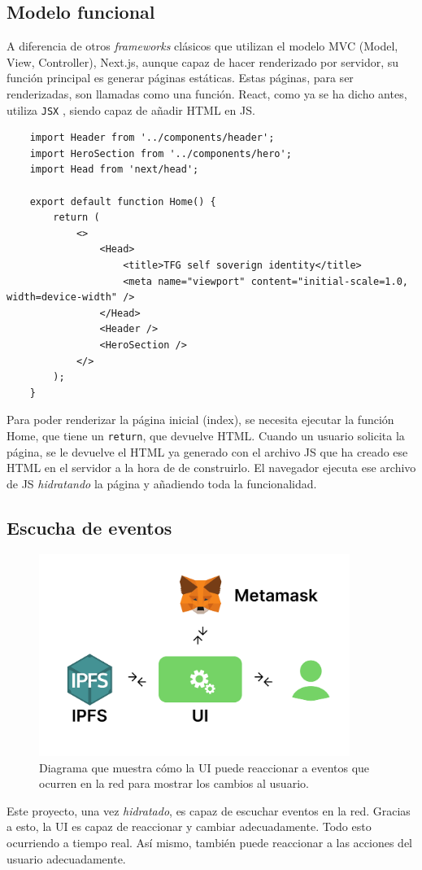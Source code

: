 \subsection{Modelo funcional}
A diferencia de otros \textit{frameworks} clásicos que utilizan el modelo MVC (Model, View, Controller), Next.js, aunque capaz de hacer renderizado por servidor, su función principal es generar páginas estáticas. Estas páginas, para ser renderizadas, son llamadas como una función. React, como ya se ha dicho antes, utiliza \verb|JSX| \cite{web:jsx}, siendo capaz de añadir HTML en JS.
\begin{lstlisting}
    import Header from '../components/header';
    import HeroSection from '../components/hero';
    import Head from 'next/head';

    export default function Home() {
        return (
            <>
                <Head>
                    <title>TFG self soverign identity</title>
                    <meta name="viewport" content="initial-scale=1.0, width=device-width" />
                </Head>
                <Header />
                <HeroSection />
            </>
        );
    }
\end{lstlisting}
Para poder renderizar la página inicial (index), se necesita ejecutar la función Home, que tiene un \verb|return|, que devuelve HTML.
Cuando un usuario solicita la página, se le devuelve el HTML ya generado con el archivo JS que ha creado ese HTML en el servidor a la hora de de construirlo. El navegador ejecuta ese archivo de JS \textit{hidratando} la página y añadiendo toda la funcionalidad.
\subsection{Escucha de eventos}
\begin{figure}[h!]
    \centering
    \includegraphics[width=0.9\textwidth]{Figures/Reactividad.png}
    \caption{Diagrama que muestra cómo la UI puede reaccionar a eventos que ocurren en la red para mostrar los cambios al usuario.}
\end{figure}
Este proyecto, una vez \textit{hidratado}, es capaz de escuchar eventos en la red. Gracias a esto, la UI es capaz de reaccionar y cambiar adecuadamente. Todo esto ocurriendo a tiempo real. Así mismo, también puede reaccionar a las acciones del usuario adecuadamente.
